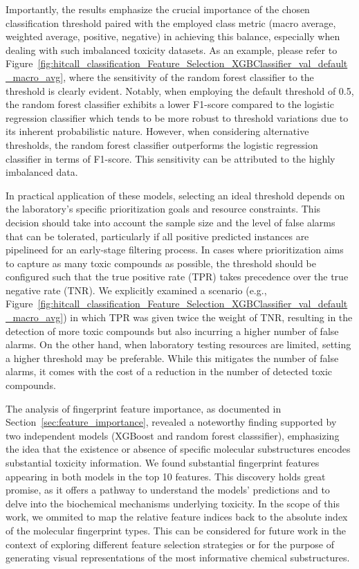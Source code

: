 Importantly, the results emphasize the crucial importance of the chosen classification threshold paired with the employed class metric (macro average, weighted average, positive, negative) in achieving this balance, especially when dealing with such imbalanced toxicity datasets. As an example, please refer to Figure~\ref{fig:hitcall_classification_Feature_Selection_XGBClassifier_val_default_macro_avg}, where the sensitivity of the random forest classifier to the threshold is clearly evident. Notably, when employing the default threshold of 0.5, the random forest classifier exhibits a lower F1-score compared to the logistic regression classifier which tends to be more robust to threshold variations due to its inherent probabilistic nature. However, when considering alternative thresholds, the random forest classifier outperforms the logistic regression classifier in terms of F1-score. This sensitivity can be attributed to the highly imbalanced data. 

In practical application of these models, selecting an ideal threshold depends on the laboratory's specific prioritization goals and resource constraints. This decision should take into account the sample size and the level of false alarms that can be tolerated, particularly if all positive predicted instances are pipelineed for an early-stage filtering process. In cases where prioritization aims to capture as many toxic compounds as possible, the threshold should be configured such that the true positive rate (TPR) takes precedence over the true negative rate (TNR). We explicitly examined a scenario (e.g., Figure~\ref{fig:hitcall_classification_Feature_Selection_XGBClassifier_val_default_macro_avg}) in which TPR was given twice the weight of TNR, resulting in the detection of more toxic compounds but also incurring a higher number of false alarms. On the other hand, when laboratory testing resources are limited, setting a higher threshold may be preferable. While this mitigates the number of false alarms, it comes with the cost of a reduction in the number of detected toxic compounds.

The analysis of fingerprint feature importance, as documented in Section~\ref{sec:feature_importance}, revealed a noteworthy finding supported by two independent models (XGBoost and random forest classsifier), emphasizing the idea that the existence or absence of specific molecular substructures encodes substantial toxicity information. We found substantial fingerprint features appearing in both models in the top 10 features. This discovery holds great promise, as it offers a pathway to understand the models' predictions and to delve into the biochemical mechanisms underlying toxicity. In the scope of this work, we ommited to map the relative feature indices back to the absolute index of the molecular fingerprint types. This can be considered for future work in the context of exploring different feature selection strategies or for the purpose of generating visual representations of the most informative chemical substructures. 





